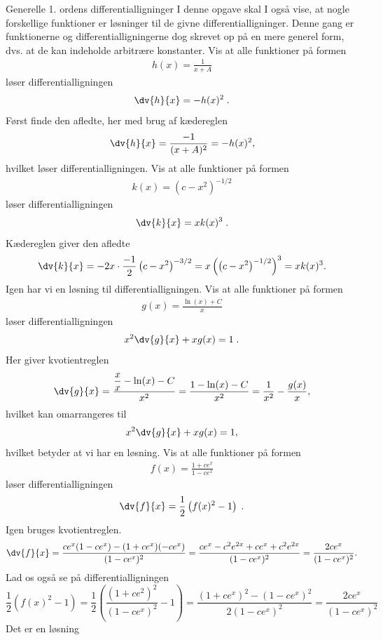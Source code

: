 \begin{opgave}{Generelle 1. ordens differentialligninger}
I denne opgave skal I også vise, at nogle forskellige funktioner er løsninger til de givne differentialligninger. Denne gang er funktionerne og differentialligningerne dog skrevet op på en mere generel form, dvs. at de kan indeholde arbitrære konstanter.
\opg Vis at alle funktioner på formen
\begin{align*}
	h(x) = \frac{1}{x + A} 
\end{align*}
løser differentialligningen
\begin{align*}
	\dv{h}{x} = - h(x)^2 \; .
\end{align*}
Først finde den afledte, her med brug af kædereglen
$$
\dv{h}{x}=\frac{-1}{(x+A)^2}=-h(x)^2,
$$
hvilket løser differentialligningen.
\opg Vis at alle funktioner på formen
\begin{align*}
	k(x) = \left( c - x^2 \right)^{-1/2}
\end{align*}
løser differentialligningen
\begin{align*}
	\dv{k}{x} = x k(x)^3 \; .
\end{align*}
Kædereglen giver den afledte
$$
\dv{k}{x}=-2x\cdot \frac{-1}{2}\left(c-x^2\right)^{-3/2}=x\left(\left(c-x^2\right)^{-1/2}\right)^3=xk(x)^3.
$$
Igen har vi en løsning til differentialligningen.
\opg Vis at alle funktioner på formen
\begin{align*}
	g(x) = \frac{\ln (x) + C}{x}
\end{align*}
løser differentialligningen
\begin{align*}
	x^2 \dv{g}{x} + xg(x) = 1 \; .
\end{align*} 
Her giver kvotientreglen
$$
\dv{g}{x}=\dfrac{\dfrac{x}{x}-\ln(x)-C}{x^2}=\frac{1-\ln(x)-C}{x^2}=\frac{1}{x^2}-\frac{g(x)}{x},
$$
hvilket kan omarrangeres til
$$
x^2\dv{g}{x}+xg(x)=1,
$$
hvilket betyder at vi har en løsning.
\opg Vis at alle funktioner på formen
\begin{align*}
	f(x) = \frac{1 + ce^x}{1-ce^x}
\end{align*}
løser differentialligningen
\begin{align*}
	\dv{f}{x} = \frac{1}{2} \left( f(x)^2 - 1 \right) \; .
\end{align*} 
Igen bruges kvotientreglen.
$$
\dv{f}{x}=\frac{ce^x(1-ce^x)-(1+ce^x)(-ce^x)}{(1-ce^x)^2}=\frac{ce^x-c^2e^{2x}+ce^x+c^2e^{2x}}{(1-ce^x)^2}=\frac{2ce^x}{(1-ce^x)^2}.
$$
Lad os også se på differentialligningen
$$
\frac{1}{2}\left(f(x)^2-1\right)=\frac{1}{2}\left(\frac{(1+ce^2)^2}{(1-ce^x)^2}-1\right)=\frac{(1+ce^x)^2-(1-ce^x)^2}{2(1-ce^x)^2}=\frac{2ce^x}{(1-ce^x)^2}
$$
Det er en løsning
\end{opgave}


